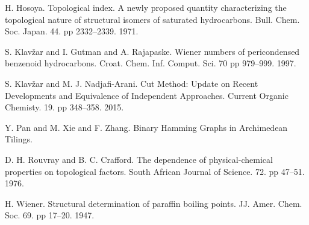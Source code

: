 \documentclass[11pt,a4paper]{article}
\begin{document}
\begin{thebibliography}{10}
 H. Hosoya. Topological index. A newly proposed quantity characterizing the topological nature of structural isomers of saturated hydrocarbons. Bull. Chem. Soc. Japan. 44. pp 2332--2339. 1971.

 S. Klav\v{z}ar and I. Gutman and A. Rajapaske. Wiener numbers of pericondensed benzenoid hydrocarbons. Croat. Chem. Inf. Comput. Sci. 70 pp 979--999. 1997.

 S. Klav\v{z}ar and M. J. Nadjafi-Arani. Cut Method: Update on Recent Developments and Equivalence of Independent Approaches. Current Organic Chemisty. 19. pp 348--358. 2015.

 Y. Pan and M. Xie and F. Zhang. Binary Hamming Graphs in Archimedean Tilings. 

 D. H. Rouvray and B. C. Crafford. The dependence of physical-chemical properties on topological factors. South African Journal of Science. 72. pp 47--51. 1976.

 H. Wiener. Structural determination of paraffin boiling points. JJ. Amer. Chem. Soc. 69. pp 17--20. 1947.
\end{thebibliography}
\end{document}
